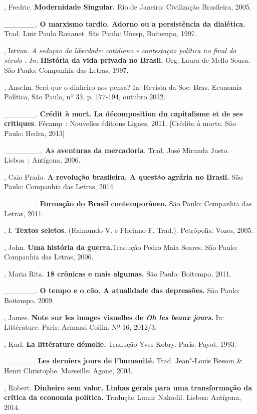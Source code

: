 \begin{Parskip}
, Fredric. \textbf{Modernidade Singular.} Rio de Janeiro:
Civilização Brasileira, 2005.

\_\_\_\_\_\_. \textbf{O marxismo tardio. Adorno ou a persistência da
dialética.} Trad. Luiz Paulo Rouanet. São Paulo: Unesp, Boitempo, 1997.

, Istvan. \emph{A sedução da liberdade: cotidiano e contestação
política no final do século . In:} \textbf{História da vida privada
no Brasil.} Org. Laura de Mello Sousa. São Paulo: Companhia das Letras,
1997.

, Anselm. Será que o dinheiro nos pensa? In: Revista da Soc. Bras.
Economia Política, São Paulo, nº 33, p. 177-194, outubro 2012.

\_\_\_\_\_\_. \textbf{Crédit à mort. La décomposition du capitalisme et
de ses critiques}. Fécamp~: Nouvelles éditions Lignes, 2011. [Crédito
à morte. São Paulo: Hedra, 2013]

\_\_\_\_\_\_\_. \textbf{As aventuras da mercadoria}. Trad. José
Miranda Justo. Lisboa~: Antígona, 2006.

, Caio Prado. \textbf{A revolução brasileira. A questão agrária no
Brasil.} São Paulo: Companhia das Letras, 2014

\_\_\_\_\_\_. \textbf{Formação do Brasil contemporâneo.} São Paulo:
Companhia das Letras, 2011.

, I. \textbf{Textos seletos}. (Raimundo V. e Floriano F. Trad.).
Petrópolis: Vozes, 2005.

, John. \textbf{Uma história da guerra.}Tradução Pedro Maia
Soares. São Paulo: Companhia das Letras, 2006.

, Maria Rita. \textbf{18 crônicas e mais algumas.} São Paulo:
Boitempo, 2011.

\_\_\_\_\_\_. \textbf{O tempo e o cão. A atualidade das depressões.} São
Paulo: Boitempo, 2009.

, James. \textbf{Note sur les images visuelles de \emph{Oh les
beaux jours}.} In: Littérature. Paris: Armand Collin. Nº 16, 2012/3.

, Karl. \textbf{La littérature démolie.} Tradução Yves Kobry.
Paris: Payot, 1993.

\_\_\_\_\_\_ \textbf{Les derniers jours de l'humanité.} Trad. Jean"-Louis
Besson \& Henri Christophe. Marseille: Agone, 2003.

, Robert. \textbf{Dinheiro sem valor. Linhas gerais para uma
transformação da crítica da economia política.} Tradução Lumir Nahodil.
Lisboa: Antígona, 2014.


\end{Parskip}
